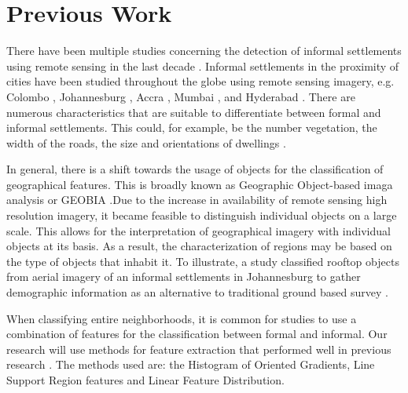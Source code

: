 \section{Previous Work}

There have been multiple studies concerning the detection of informal
settlements using remote sensing in the last decade \cite{kuffer2016slums}.
Informal settlements in the proximity of cities have been studied throughout
the globe using remote sensing imagery, e.g. Colombo \cite{colombo},
Johannesburg \cite{williams2016automatic}, Accra \cite{accra}, Mumbai
\cite{mumbai}, and Hyderabad \cite{hyderabad}. There are numerous
characteristics that are suitable to differentiate between formal and informal
settlements. This could, for example,  be the number vegetation, the width of
the roads, the size and orientations of dwellings \cite{owen2013approach}.

In general, there is a shift towards the usage of objects for the
classification of geographical features. This is broadly known as Geographic
Object-based imaga analysis or GEOBIA \cite{hay2008geographic}.Due to the
increase in availability of remote sensing high resolution imagery, it became
feasible to distinguish individual objects on a large scale.  This allows for
the interpretation of geographical imagery with individual objects at its
basis.  As a result, the characterization of regions may be based on the type
of objects that inhabit it.  To illustrate, a study classified rooftop objects
from aerial imagery of an informal settlements in Johannesburg to gather
demographic information as an alternative to traditional ground based survey
\cite{williams2016automatic}.

When classifying entire neighborhoods, it is common for studies to use
a combination of features for the classification between formal and informal.
Our research will use methods for feature extraction that performed well in
previous research \cite{graesser2012image}. The methods used are: the Histogram
of Oriented Gradients, Line Support Region features and Linear Feature
Distribution.


